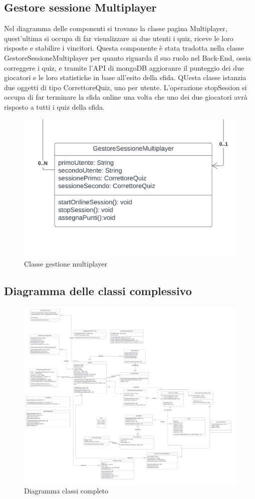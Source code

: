 \subsection{Gestore sessione Multiplayer}
Nel diagramma delle componenti si trovano la classe pagina Multiplayer, quest'ultima si occupa di far visualizzare ai due utenti i quiz, riceve le loro risposte e stabilire i vincitori. Questa componente è stata tradotta nella classe GestoreSessioneMultiplayer per quanto riguarda il suo ruolo nel Back-End, ossia correggere i quiz, e tramite l'API di mongoDB aggioranre il punteggio dei due giocatori e le loro statistiche in base all'esito della sfida. QUesta classe istanzia due oggetti di tipo CorrettoreQuiz, uno per utente. L'operazione stopSession si occupa di far terminare la sfida online una volta che uno dei due giocatori avrà risposto a tutti i quiz della sfida. 

\begin{figure}[!h]
\centering
\includegraphics[scale=0.10]{images/classe_gestore_sessione_multiplayer.png}
\caption{Classe gestione multiplayer}
\label{fig:classe_multiplayer}
\end{figure}
\noindent

\newpage
\subsection{Diagramma delle classi complessivo}
\begin{figure}[!h]
\centering
\includegraphics[scale=0.07]{images/diagramma_delle_classi_complessivo.png}
\caption{Diagramma classi completo}
\label{fig:diagramma_classi}
\end{figure}
\noindent